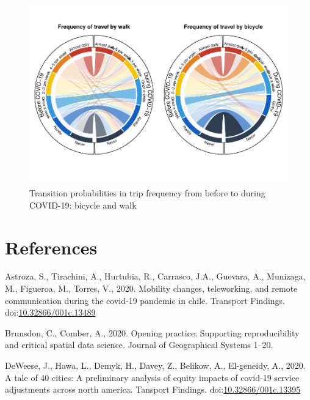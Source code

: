 \documentclass[]{elsarticle} %
\begin{document}
\begin{figure}
\centering
\includegraphics{Frequency-of-Travel-by-Mode-COVID-19-Bangladesh_files/figure-latex/circular-plots-transition-probabilities-4-1.pdf}
\caption{\label{fig:circular-plot-4}Transition probabilities in trip
frequency from before to during COVID-19: bicycle and walk}
\end{figure}

\hypertarget{references}{%
\section*{References}\label{references}}

\hypertarget{refs}{}
\leavevmode\hypertarget{ref-Astroza2020mobility}{}%
Astroza, S., Tirachini, A., Hurtubia, R., Carrasco, J.A., Guevara, A.,
Munizaga, M., Figueroa, M., Torres, V., 2020. Mobility changes,
teleworking, and remote communication during the covid-19 pandemic in
chile. Transport Findings.
doi:\href{https://doi.org/10.32866/001c.13489}{10.32866/001c.13489}

\leavevmode\hypertarget{ref-Brunsdon2020opening}{}%
Brunsdon, C., Comber, A., 2020. Opening practice: Supporting
reproducibility and critical spatial data science. Journal of
Geographical Systems 1--20.

\leavevmode\hypertarget{ref-DeWeese2020tale}{}%
DeWeese, J., Hawa, L., Demyk, H., Davey, Z., Belikow, A., El-geneidy,
A., 2020. A tale of 40 cities: A preliminary analysis of equity impacts
of covid-19 service adjustments across north america. Tansport Findings.
doi:\href{https://doi.org/10.32866/001c.13395}{10.32866/001c.13395}
\end{document}
